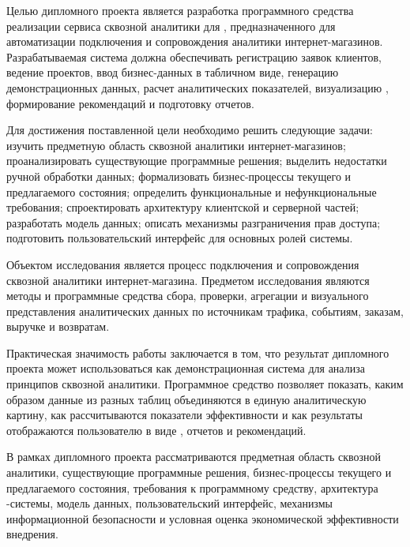 Целью дипломного проекта является разработка программного средства реализации сервиса сквозной аналитики для , предназначенного для автоматизации подключения и сопровождения аналитики интернет-магазинов. Разрабатываемая система должна обеспечивать регистрацию заявок клиентов, ведение проектов, ввод бизнес-данных в табличном виде, генерацию демонстрационных данных, расчет аналитических показателей, визуализацию , формирование рекомендаций и подготовку отчетов.

Для достижения поставленной цели необходимо решить следующие задачи: изучить предметную область сквозной аналитики интернет-магазинов; проанализировать существующие программные решения; выделить недостатки ручной обработки данных; формализовать бизнес-процессы текущего и предлагаемого состояния; определить функциональные и нефункциональные требования; спроектировать архитектуру клиентской и серверной частей; разработать модель данных; описать механизмы разграничения прав доступа; подготовить пользовательский интерфейс для основных ролей системы.

Объектом исследования является процесс подключения и сопровождения сквозной аналитики интернет-магазина. Предметом исследования являются методы и программные средства сбора, проверки, агрегации и визуального представления аналитических данных по источникам трафика, событиям, заказам, выручке и возвратам.

Практическая значимость работы заключается в том, что результат дипломного проекта может использоваться как демонстрационная система для анализа принципов сквозной аналитики. Программное средство позволяет показать, каким образом данные из разных таблиц объединяются в единую аналитическую картину, как рассчитываются показатели эффективности и как результаты отображаются пользователю в виде , отчетов и рекомендаций.

В рамках дипломного проекта рассматриваются предметная область сквозной аналитики, существующие программные решения, бизнес-процессы текущего и предлагаемого состояния, требования к программному средству, архитектура -системы, модель данных, пользовательский интерфейс, механизмы информационной безопасности и условная оценка экономической эффективности внедрения.
